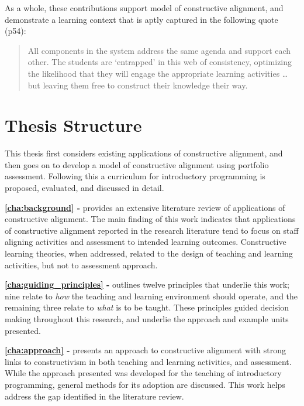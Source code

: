 As a whole, these contributions support \citet{Biggs:1996c} model of constructive alignment, and demonstrate a learning context that is aptly captured in the following quote \citep{Biggs:2007} (p54):
\begin{quote}
	All components in the system address the same agenda and support each other. The students are `entrapped' in this web of consistency, optimizing the likelihood that they will engage the appropriate learning activities \ldots but leaving them free to construct their knowledge their way.
\end{quote}



\section{Thesis Structure} %
\label{sec:thesis_structure}

This thesis first considers existing applications of constructive alignment, and then goes on to develop a model of constructive alignment using portfolio assessment. Following this a curriculum for introductory programming is proposed, evaluated, and discussed in detail. 

\textbf{\cref{cha:background} - } provides an extensive literature review of applications of constructive alignment. The main finding of this work indicates that applications of constructive alignment reported in the research literature tend to focus on staff aligning activities and assessment to intended learning outcomes. Constructive learning theories, when addressed, related to the design of teaching and learning activities, but not to assessment approach.

\textbf{\cref{cha:guiding_principles} - } outlines twelve principles that underlie this work; nine relate to \emph{how} the teaching and learning environment should operate, and the remaining three relate to \emph{what} is to be taught. These principles guided decision making throughout this research, and underlie the approach and example units presented.

\textbf{\cref{cha:approach} - } presents an approach to constructive alignment with strong links to constructivism in both teaching and learning activities, and assessment. While the approach presented was developed for the teaching of introductory programming, general methods for its adoption are discussed. This work helps address the gap identified in the literature review.

